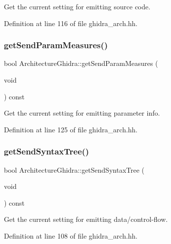 Get the current setting for emitting source code. 



Definition at line 116 of file ghidra\+\_\+arch.\+hh.

\mbox{\label{class_architecture_ghidra_aba0f384bc9a5aa9155cb61c900e80d04}} 
\subsubsection{\texorpdfstring{getSendParamMeasures()}{getSendParamMeasures()}}
{\footnotesize\ttfamily bool Architecture\+Ghidra\+::get\+Send\+Param\+Measures (\begin{DoxyParamCaption}\item[{void}]{ }\end{DoxyParamCaption}) const\hspace{0.3cm}{\ttfamily [inline]}}



Get the current setting for emitting parameter info. 



Definition at line 125 of file ghidra\+\_\+arch.\+hh.

\mbox{\label{class_architecture_ghidra_ab8f4f7bfabe1dc8f0ead49700c27a06d}} 
\subsubsection{\texorpdfstring{getSendSyntaxTree()}{getSendSyntaxTree()}}
{\footnotesize\ttfamily bool Architecture\+Ghidra\+::get\+Send\+Syntax\+Tree (\begin{DoxyParamCaption}\item[{void}]{ }\end{DoxyParamCaption}) const\hspace{0.3cm}{\ttfamily [inline]}}



Get the current setting for emitting data/control-\/flow. 



Definition at line 108 of file ghidra\+\_\+arch.\+hh.

